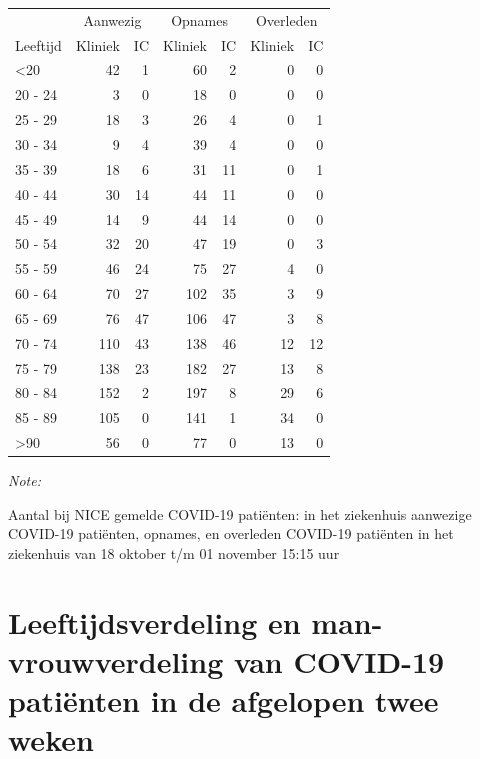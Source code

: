 \documentclass[
  english,
  man,floatsintext]{apa6}
\begin{document}
\begin{table}
\centering\begingroup\fontsize{10}{12}\selectfont

\begin{threeparttable}
\begin{tabular}{lrrrrrr}
\toprule
\multicolumn{1}{c}{ } & \multicolumn{2}{c}{Aanwezig} & \multicolumn{2}{c}{Opnames} & \multicolumn{2}{c}{Overleden} \\
\cmidrule(l{3pt}r{3pt}){2-3} \cmidrule(l{3pt}r{3pt}){4-5} \cmidrule(l{3pt}r{3pt}){6-7}
Leeftijd & Kliniek & IC & Kliniek & IC & Kliniek & IC\\
\midrule
<20 & 42 & 1 & 60 & 2 & 0 & 0\\
20 - 24 & 3 & 0 & 18 & 0 & 0 & 0\\
25 - 29 & 18 & 3 & 26 & 4 & 0 & 1\\
30 - 34 & 9 & 4 & 39 & 4 & 0 & 0\\
35 - 39 & 18 & 6 & 31 & 11 & 0 & 1\\
40 - 44 & 30 & 14 & 44 & 11 & 0 & 0\\
45 - 49 & 14 & 9 & 44 & 14 & 0 & 0\\
50 - 54 & 32 & 20 & 47 & 19 & 0 & 3\\
55 - 59 & 46 & 24 & 75 & 27 & 4 & 0\\
60 - 64 & 70 & 27 & 102 & 35 & 3 & 9\\
65 - 69 & 76 & 47 & 106 & 47 & 3 & 8\\
70 - 74 & 110 & 43 & 138 & 46 & 12 & 12\\
75 - 79 & 138 & 23 & 182 & 27 & 13 & 8\\
80 - 84 & 152 & 2 & 197 & 8 & 29 & 6\\
85 - 89 & 105 & 0 & 141 & 1 & 34 & 0\\
>90 & 56 & 0 & 77 & 0 & 13 & 0\\
\bottomrule
\end{tabular}
\begin{tablenotes}
\item \textit{Note: } 
\item Aantal bij NICE gemelde COVID-19 patiënten: in het ziekenhuis aanwezige COVID-19 patiënten, opnames, en overleden COVID-19 patiënten in het ziekenhuis van 18 oktober t/m 01 november 15:15 uur
\end{tablenotes}
\end{threeparttable}
\endgroup{}
\end{table}

\newpage

\hypertarget{leeftijdsverdeling-en-man-vrouwverdeling-van-covid-19-patiuxebnten-in-de-afgelopen-twee-weken}{%
\section{Leeftijdsverdeling en man-vrouwverdeling van COVID-19 patiënten in de afgelopen twee weken}\label{leeftijdsverdeling-en-man-vrouwverdeling-van-covid-19-patiuxebnten-in-de-afgelopen-twee-weken}}
\end{document}
